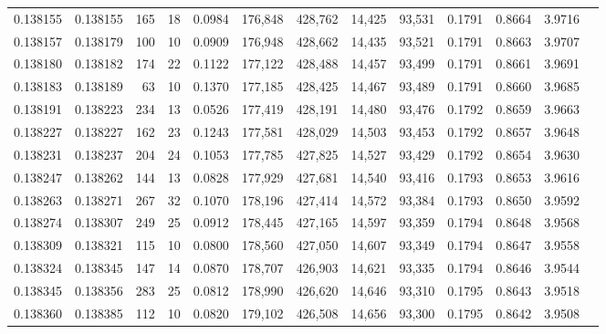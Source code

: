 \begin{tabular}{rrrrrrrrrrrrr}
0.138155 & 0.138155 &   165 &  18 &                                     0.0984 & 176,848 & 428,762 &  14,425 &  93,531 & 0.1791 & 0.8664 & 3.9716 \\
0.138157 & 0.138179 &   100 &  10 &                                     0.0909 & 176,948 & 428,662 &  14,435 &  93,521 & 0.1791 & 0.8663 & 3.9707 \\
0.138180 & 0.138182 &   174 &  22 &                                     0.1122 & 177,122 & 428,488 &  14,457 &  93,499 & 0.1791 & 0.8661 & 3.9691 \\
0.138183 & 0.138189 &    63 &  10 &                                     0.1370 & 177,185 & 428,425 &  14,467 &  93,489 & 0.1791 & 0.8660 & 3.9685 \\
0.138191 & 0.138223 &   234 &  13 &                                     0.0526 & 177,419 & 428,191 &  14,480 &  93,476 & 0.1792 & 0.8659 & 3.9663 \\
0.138227 & 0.138227 &   162 &  23 &                                     0.1243 & 177,581 & 428,029 &  14,503 &  93,453 & 0.1792 & 0.8657 & 3.9648 \\
0.138231 & 0.138237 &   204 &  24 &                                     0.1053 & 177,785 & 427,825 &  14,527 &  93,429 & 0.1792 & 0.8654 & 3.9630 \\
0.138247 & 0.138262 &   144 &  13 &                                     0.0828 & 177,929 & 427,681 &  14,540 &  93,416 & 0.1793 & 0.8653 & 3.9616 \\
0.138263 & 0.138271 &   267 &  32 &                                     0.1070 & 178,196 & 427,414 &  14,572 &  93,384 & 0.1793 & 0.8650 & 3.9592 \\
0.138274 & 0.138307 &   249 &  25 &                                     0.0912 & 178,445 & 427,165 &  14,597 &  93,359 & 0.1794 & 0.8648 & 3.9568 \\
0.138309 & 0.138321 &   115 &  10 &                                     0.0800 & 178,560 & 427,050 &  14,607 &  93,349 & 0.1794 & 0.8647 & 3.9558 \\
0.138324 & 0.138345 &   147 &  14 &                                     0.0870 & 178,707 & 426,903 &  14,621 &  93,335 & 0.1794 & 0.8646 & 3.9544 \\
0.138345 & 0.138356 &   283 &  25 &                                     0.0812 & 178,990 & 426,620 &  14,646 &  93,310 & 0.1795 & 0.8643 & 3.9518 \\
0.138360 & 0.138385 &   112 &  10 &                                     0.0820 & 179,102 & 426,508 &  14,656 &  93,300 & 0.1795 & 0.8642 & 3.9508 \\

\end{tabular}
